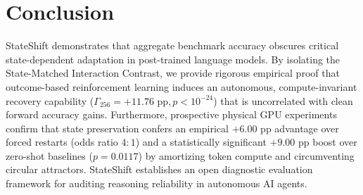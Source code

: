 \documentclass[11pt]{article}
\begin{document}
\section{Conclusion}
StateShift demonstrates that aggregate benchmark accuracy obscures critical state-dependent adaptation in post-trained language models. By isolating the State-Matched Interaction Contrast, we provide rigorous empirical proof that outcome-based reinforcement learning induces an autonomous, compute-invariant recovery capability ($\Gamma_{256} = +11.76\text{ pp}, p < 10^{-24}$) that is uncorrelated with clean forward accuracy gains. Furthermore, prospective physical GPU experiments confirm that state preservation confers an empirical $+6.00\text{ pp}$ advantage over forced restarts (odds ratio $4:1$) and a statistically significant $+9.00\text{ pp}$ boost over zero-shot baselines ($p = 0.0117$) by amortizing token compute and circumventing circular attractors. StateShift establishes an open diagnostic evaluation framework for auditing reasoning reliability in autonomous AI agents.



\end{document}
